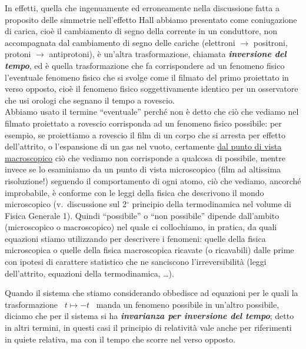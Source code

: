In effetti, quella che ingenuamente ed erroneamente nella discussione fatta a
proposito delle simmetrie nell'effetto Hall abbiamo presentato come coniugazione
di carica, cio\`e il cambiamento di segno della corrente in un conduttore, non
accompagnata dal
cambiamento di segno delle cariche (elettroni $\to$ positroni, protoni $\to$
antiprotoni), \`e un'altra trasformazione, chiamata \textbf{\textit{inversione
del tempo}}, ed \`e quella trasformazione che fa corrispondere ad un fenomeno
fisico l'eventuale fenomeno fisico che si svolge come il filmato del primo
proiettato in verso opposto, cio\`e il fenomeno fisico soggettivamente identico
per un osservatore che usi orologi che segnano il tempo a rovescio.\\
Abbiamo usato il termine ``eventuale'' perch\'e non \`e detto che ci\`o che
vediamo nel filmato proiettato a rovescio corrisponda ad un fenomeno fisico
possibile: per esempio, se proiettiamo a rovescio il film di un corpo che si
arresta per effetto dell'attrito, o l'espansione di un gas nel vuoto, certamente
\underline{dal punto di vista macroscopico} ci\`o che vediamo non corrisponde a
qualcosa di possibile, mentre invece se lo esaminiamo da un punto di vista
microscopico (film ad altissima risoluzione!) seguendo il comportamento di ogni
atomo, ci\`o che vediamo, ancorch\'e improbabile, \`e conforme con le leggi
della fisica che descrivono il mondo microscopico (v.\ discussione sul 2$^\circ$
principio della termodinamica nel volume di Fisica Generale 1). Quindi
``possibile'' o ``non possibile'' dipende dall'ambito (microscopico o
macroscopico) nel quale ci collochiamo, in pratica, da quali equazioni stiamo
utilizzando per descrivere i fenomeni: quelle della fisica microscopica o quelle
della fisica macroscopica ricavate (o ricavabili) dalle prime con ipotesi di
carattere statistico che ne sanciscono l'irreversibilit\`a (leggi dell'attrito,
equazioni della termodinamica, \dots).

Quando il sistema che stiamo considerando obbedisce ad equazioni per le quali la
trasformazione \ $t\mapsto-t$ \ manda un fenomeno possibile in un'altro
possibile, diciamo che per il sistema si ha \textbf{\textit{invarianza per
inversione del tempo}}; detto in altri termini, in questi casi il principio di
relativit\`a vale anche per riferimenti in quiete relativa, ma con il tempo che
scorre nel verso opposto.

